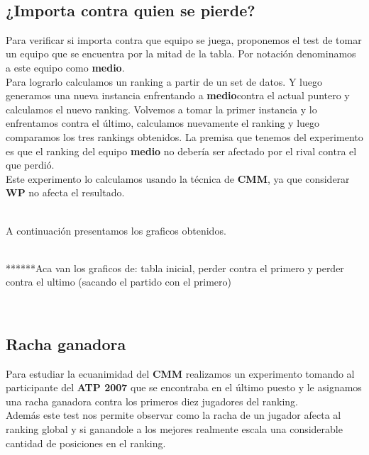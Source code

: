 \\




\subsection{¿Importa contra quien se pierde?}

Para verificar si importa contra que equipo se juega, proponemos el test de tomar un equipo que se encuentra por la mitad de la tabla. Por notación denominamos a este equipo como \textbf{medio}. \\

Para lograrlo calculamos un ranking a partir de un set de datos. Y luego generamos una nueva instancia enfrentando a \textbf{medio}contra el actual puntero y calculamos el nuevo ranking. Volvemos a tomar la primer instancia y lo enfrentamos contra el último, calculamos nuevamente el ranking y luego comparamos los tres rankings obtenidos. La premisa que tenemos del experimento es que el ranking del equipo \textbf{medio} no debería ser afectado por el rival contra el que perdió.\\

Este experimento lo calculamos usando la técnica de \textbf{CMM}, ya que considerar \textbf{WP} no afecta el resultado.

\\
A continuación presentamos los graficos obtenidos.

\\


******Aca van los graficos de: tabla inicial, perder contra el primero y perder contra el ultimo (sacando el partido con el primero)

\\



\subsection{Racha ganadora}

Para estudiar la ecuanimidad del \textbf{CMM} realizamos un experimento tomando al participante del \textbf{ATP 2007} que se encontraba en el último puesto y le asignamos una racha ganadora contra los primeros diez jugadores del ranking. \\

Además este test nos permite observar como la racha de un jugador afecta al ranking global y si ganandole a los mejores realmente escala una considerable cantidad de posiciones en el ranking. \\

